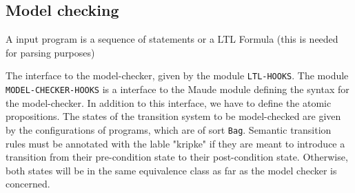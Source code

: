 \documentclass{article}
\begin{document}
\begin{kdefinition}
\begin{module}{}
\begin{syntaxBlock}{}
\end{syntaxBlock}

\begin{syntaxBlock}{}
\end{syntaxBlock}

\begin{syntaxBlock}{}
\end{syntaxBlock}

\begin{syntaxBlock}{}
\end{syntaxBlock}
\end{module}
\begin{module}{}
\begin{kblock}[text]
 \section{Model checking} \end{kblock}
\begin{kblock}[text]

    A input program is a sequence of statements or a LTL Formula 
    (this is needed for parsing purposes)
  \end{kblock}

\begin{syntaxBlock}{}
\end{syntaxBlock}
\begin{kblock}[text]

    The interface to the model-checker, given by the module \texttt{LTL-HOOKS}.
    The module \texttt{MODEL-CHECKER-HOOKS} is a \K interface to the Maude module 
    defining the syntax for the model-checker. 
    In addition to this interface, we have to define the atomic propositions.
    The states of the transition system to be model-checked are given
    by the configurations of programs, which are of sort \texttt{Bag}.
    Semantic transition rules must be annotated with the lable "kripke" if they are meant to introduce a transition from their pre-condition state to their post-condition state. Otherwise, both states will be in the same equivalence class as far as the model checker is concerned.
   \end{kblock}
\begin{kblock}[text]

\end{kblock}
\end{module}
\end{kdefinition}
\end{document}
